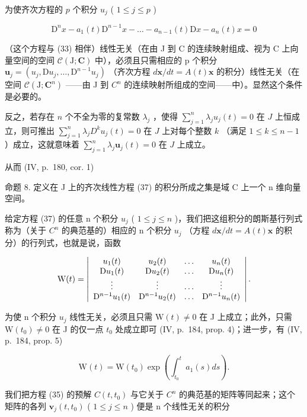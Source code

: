 为使齐次方程的 \(p\) 个积分 \(u_{j}\) ( \(1 \leqslant j \leqslant p\) )

\[
\mathrm{D} ^ {n} x - a _ {1} (t) \mathrm{D} ^ {n - 1} x - \dots - a _ {n - 1} (t) \mathrm{D} x - a _ {n} (t) x = 0\tag{37}
\]

（这个方程与 (33) 相伴）线性无关（在由 J 到 C 的连续映射组成、视为 C 上向量空间的空间 \(\mathcal{C}(\mathrm{J};\mathbf{C})\) 中），必须且只需相应的 p 个积分 \(\mathbf{u}_{j}=(u_{j},\mathrm{D}u_{j},\ldots,\mathrm{D}^{n-1}u_{j})\) （齐次方程 \(d\mathbf{x}/dt=A(t)\mathbf{x}\) 的积分）线性无关（在空间 \(\mathcal{C}(\mathrm{J};\mathbf{C}^{n})\) ——由 J 到 \(C^{n}\) 的连续映射所组成的空间——中）。显然这个条件是必要的。

反之，若存在 \(n\) 个不全为零的复常数 \(\lambda_j\) ，使得 \(\sum_{j=1}^{n} \lambda_j u_j(t) = 0\) 在 \(J\) 上恒成立，则可推出 \(\sum_{j=1}^{n} \lambda_j D^k u_j(t) = 0\) 在 \(J\) 上对每个整数 \(k\) （满足 \(1 \leqslant k \leqslant n - 1\) ）成立，这就意味着 \(\sum_{j=1}^{n} \lambda_j \mathbf{u}_j(t) = 0\) 在 \(J\) 上成立。

从而 (IV, p.~180, cor. 1)

命题 8. 定义在 J 上的齐次线性方程 (37) 的积分所成之集是域 C 上一个 n 维向量空间。

给定方程 (37) 的任意 n 个积分 \(u_{j}\) ( \(1 \leqslant j \leqslant n\) )，我们把这组积分的朗斯基行列式称为（关于 \(C^{n}\) 的典范基的）相应的 n 个积分 \(u_{j}\) （方程 \(d\mathbf{x}/dt = A(t)\mathbf{x}\) 的积分）的行列式，也就是说，函数

\[
\mathrm{W} (t) = \left| \begin{array}{c c c c} u _ {1} (t) & u _ {2} (t) & \ldots & u _ {n} (t) \\ \mathrm{D} u _ {1} (t) & \mathrm{D} u _ {2} (t) & \ldots & \mathrm{D} u _ {n} (t) \\ \vdots & \vdots & \ldots & \vdots \\ \mathrm{D} ^ {n - 1} u _ {1} (t) & \mathrm{D} ^ {n - 1} u _ {2} (t) & \ldots & \mathrm{D} ^ {n - 1} u _ {n} (t) \end{array} \right|.
\]

为使 n 个积分 \(u_{j}\) 线性无关，必须且只需 \(\mathrm{W}(t) \neq 0\) 在 J 上成立；此外，只需 \(\mathrm{W}(t_{0}) \neq 0\) 在 J 的仅一点 \(t_{0}\) 处成立即可 (IV, p.~184, prop. 4)；进一步，有 (IV, p.~184, prop. 5)

\[
\mathrm{W} (t) = \mathrm{W} (t _ {0}) \exp \left(\int_ {t _ {0}} ^ {t} a _ {1} (s) d s\right).\tag{38}
\]

我们把方程 (35) 的预解 \(C(t, t_{0})\) 与它关于 \(C^{n}\) 的典范基的矩阵等同起来；这个矩阵的各列 \(\mathbf{v}_{j}(t, t_{0})\) ( \(1 \leqslant j \leqslant n\) ) 便是 n 个线性无关的积分

